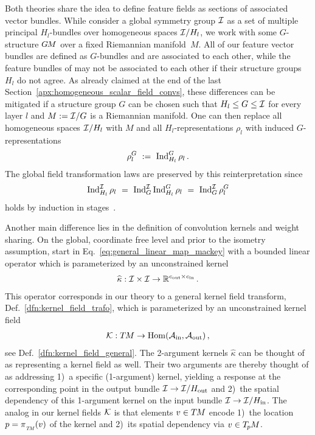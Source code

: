 Both theories share the idea to define feature fields as sections of associated vector bundles.
While \citet{Cohen2018-intertwiners}\cite{Cohen2019-generaltheory} consider a global symmetry group $\mathcal{I}$ as a set of multiple principal $H_l$-bundles over homogeneous spaces $\mathcal{I}/H_l$, we work with some $G$-structure $G\mkern-1.4muM$ over a fixed Riemannian manifold~$M$.
All of our feature vector bundles are defined as $G$-bundles and are associated to each other, while the feature bundles of \citet{Cohen2018-intertwiners}\cite{Cohen2019-generaltheory} may not be associated to each other if their structure groups $H_l$ do not agree.
As already claimed at the end of the last Section~\ref{apx:homogeneous_scalar_field_convs}, these differences can be mitigated if a structure group $G$ can be chosen such that $H_l \leq G \leq \mathcal{I}$ for every layer $l$ and $M := \mathcal{I}/G$ is a Riemannian manifold.
One can then replace all homogeneous spaces $\mathcal{I}/H_l$ with $M$ and all $H_l$-representations $\rho_l$ with induced $G$-representations
\begin{align}
    \rho_l^G\ :=\ \operatorname{Ind}_{H_l}^G \rho_l \,.
\end{align}
The global field transformation laws are preserved by this reinterpretation since
\begin{align}
    \operatorname{Ind}_{H_l}^{\mathcal{I}} \rho_l
    \ =\ \operatorname{Ind}_G^{\mathcal{I}} \operatorname{Ind}_{H_l}^G \rho_l
    \ =\ \operatorname{Ind}_G^{\mathcal{I}} \rho_l^G
\end{align}
holds by induction in stages~\cite{ceccherini2009induced}.


Another main difference lies in the definition of convolution kernels and weight sharing.
On the global, coordinate free level and prior to the isometry assumption, \citet{Cohen2018-intertwiners}\cite{Cohen2019-generaltheory} start in Eq.~\eqref{eq:general_linear_map_mackey} with a bounded linear operator which is parameterized by an unconstrained kernel
\begin{align}
    \widehat{\kappa}: \mathcal{I}\times\mathcal{I} \to \mathbb{R}^{{c_\textup{out}}\times{c_\textup{in}}} \,.
\end{align}
This operator corresponds in our theory to a general kernel field transform, Def.~\ref{dfn:kernel_field_trafo}, which is parameterized by an unconstrained kernel field
\begin{align}
    \mathcal{K}: T\mkern-1.5muM \to \operatorname{Hom}(\mathcal{A}_\textup{in},\mathcal{A}_\textup{out}) \,,
\end{align}
see Def.~\eqref{dfn:kernel_field_general}.
The 2-argument kernels $\widehat{\kappa}$ can be thought of as representing a kernel field as well.
Their two arguments are thereby thought of as addressing
1)~a specific (1-argument) kernel, yielding a response at the corresponding point in the output bundle $\mathcal{I} \to \mathcal{I}/H_{\textup{out}}$ and
2)~the spatial dependency of this 1-argument kernel on the input bundle $\mathcal{I} \to \mathcal{I}/H_{\textup{in}}$.
The analog in our kernel fields $\mathcal{K}$ is that elements $v \in T\mkern-1.5muM$ encode
1)~the location $p = \piTM(v)$ of the kernel and
2)~its spatial dependency via $v\in T_{\mkern-1.5mu p}\mkern-.5muM$.


